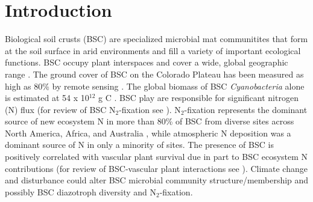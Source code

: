 \section{Introduction}
Biological soil crusts (BSC) are specialized microbial mat communitites that
form at the soil surface in arid environments and fill a variety of important
ecological functions. BSC occupy plant interspaces and cover
a wide, global geographic range \citep{garcia2003estimates}. The ground cover
of BSC on the Colorado Plateau has been measured as high as 80\% by remote
sensing \citep{karnieli2001}. The global biomass of BSC \textit{Cyanobacteria}
alone is estimated at 54 x 10$^{12}$ g C \citep{garcia2003estimates}. BSC play
are responsible for significant nitrogen (N) flux (for review of BSC
N$_{2}$-fixation see \citet{belnap2003}).  N$_{2}$-fixation represents the
dominant source of new ecosystem N in more than 80\% of BSC from diverse sites
across North America, Africa, and Australia \citep{Evans_1999}, while
atmospheric N deposition was a dominant source of N in only a minority of
sites. The presence of BSC is positively correlated with vascular plant
survival due in part to BSC ecosystem N contributions (for review of
BSC-vascular plant interactions see \citet{BelnapVascular}). Climate change and
disturbance could alter BSC microbial community structure/membership and
possibly BSC diazotroph diversity and N$_{2}$-fixation.

